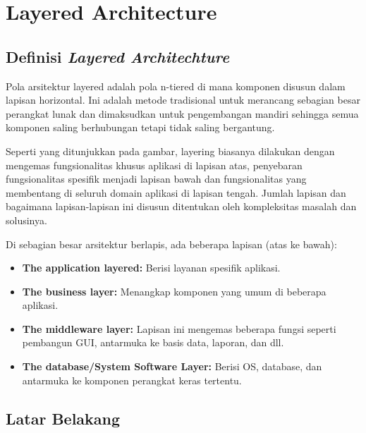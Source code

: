 \chapter{Layered Architecture}





\section{Definisi \textit{Layered Architechture}}

Pola arsitektur layered adalah pola n-tiered di mana komponen disusun dalam lapisan horizontal. Ini adalah metode tradisional untuk merancang sebagian besar perangkat lunak dan dimaksudkan untuk pengembangan mandiri sehingga semua komponen saling berhubungan tetapi tidak saling bergantung.


Seperti yang ditunjukkan pada gambar, layering biasanya dilakukan dengan mengemas fungsionalitas khusus aplikasi di lapisan atas, penyebaran fungsionalitas spesifik menjadi lapisan bawah dan fungsionalitas yang membentang di seluruh domain aplikasi di lapisan tengah. Jumlah lapisan dan bagaimana lapisan-lapisan ini disusun ditentukan oleh kompleksitas masalah dan solusinya.

Di sebagian besar arsitektur berlapis, ada beberapa lapisan (atas ke bawah):

\begin{itemize}
    \item \textbf{The application layered:} Berisi layanan spesifik aplikasi.
    \item \textbf{The business layer:} Menangkap komponen yang umum di beberapa aplikasi.
    \item \textbf{The middleware layer:} Lapisan ini mengemas beberapa fungsi seperti pembangun GUI, antarmuka ke basis data, laporan, dan dll.
    \item \textbf{The database/System Software Layer:} Berisi OS, database, dan antarmuka ke komponen perangkat keras tertentu.
\end{itemize}

\section{Latar Belakang}

